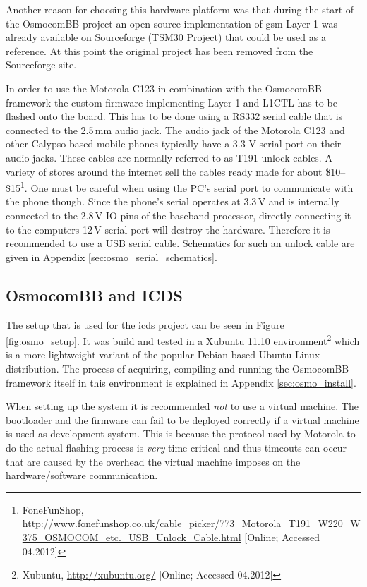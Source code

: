 Another reason for choosing this hardware platform was that during the start of the OsmocomBB project an open source implementation of \gls{gsm} Layer 1 was already available on Sourceforge (TSM30 Project) that could be used as a reference. 
At this point the original project has been removed from the Sourceforge site.

In order to use the Motorola C123 in combination with the OsmocomBB framework the custom firmware implementing Layer 1 and L1CTL has to be flashed onto the board.
This has to be done using a RS332 serial cable that is connected to the 2.5\,mm audio jack.
The audio jack of the Motorola C123 and other Calypso based mobile phones typically have a 3.3 V serial port on their audio jacks.
These cables are normally referred to as T191 unlock cables.
A variety of stores around the internet sell the cables ready made for about \$10--\$15\footnote{FoneFunShop, \url{http://www.fonefunshop.co.uk/cable_picker/773_Motorola_T191_W220_W375_OSMOCOM_etc._USB_Unlock_Cable.html} [Online; Accessed 04.2012]}.
One must be careful when using the PC's serial port to communicate with the phone though.
Since the phone's serial operates at 3.3\,V and is internally connected to the 2.8\,V IO-pins of the baseband processor, directly connecting it to the computers 12\,V serial port will destroy the hardware.
Therefore it is recommended to use a USB serial cable.
Schematics for such an unlock cable are given in Appendix \ref{sec:osmo_serial_schematics}.

\subsection{OsmocomBB and ICDS}
The setup that is used for the \gls{icds} project can be seen in Figure \ref{fig:osmo_setup}.
It was build and tested in a Xubuntu 11.10 environment\footnote{Xubuntu, \url{http://xubuntu.org/} [Online; Accessed 04.2012]} which is a more lightweight variant of the popular Debian based Ubuntu Linux distribution.
The process of acquiring, compiling and running the OsmocomBB framework itself in this environment is explained in Appendix \ref{sec:osmo_install}.

When setting up the system it is recommended \emph{not} to use a virtual machine.
The bootloader and the firmware can fail to be deployed correctly if a virtual machine is used as development system.
This is because the protocol used by Motorola to do the actual flashing process is \emph{very} time critical and thus timeouts can occur that are caused by the overhead the virtual machine imposes on the hardware/software communication.

